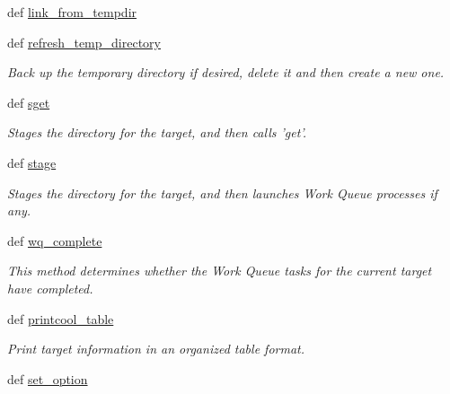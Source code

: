 \begin{DoxyCompactItemize}
def \hyperlink{classforcebalance_1_1target_1_1Target_a5aa4958cea0a48138511567a076c5a82}{link\-\_\-from\-\_\-tempdir}
\item 
def \hyperlink{classforcebalance_1_1target_1_1Target_afe815eafab06ac92f10bbf4b88ad95c8}{refresh\-\_\-temp\-\_\-directory}
\begin{DoxyCompactList}\small\item\em Back up the temporary directory if desired, delete it and then create a new one. \end{DoxyCompactList}\item 
def \hyperlink{classforcebalance_1_1target_1_1Target_a51d58b55242bf4d4909c1837174f5f3c}{sget}
\begin{DoxyCompactList}\small\item\em Stages the directory for the target, and then calls 'get'. \end{DoxyCompactList}\item 
def \hyperlink{classforcebalance_1_1target_1_1Target_af8d2a4658c87841e40296795aec478bb}{stage}
\begin{DoxyCompactList}\small\item\em Stages the directory for the target, and then launches Work Queue processes if any. \end{DoxyCompactList}\item 
def \hyperlink{classforcebalance_1_1target_1_1Target_af6099ec09486213869dba2491bd8ea04}{wq\-\_\-complete}
\begin{DoxyCompactList}\small\item\em This method determines whether the Work Queue tasks for the current target have completed. \end{DoxyCompactList}\item 
def \hyperlink{classforcebalance_1_1target_1_1Target_ac30a4e9d7d9fe06f7caefa5f7cfab09b}{printcool\-\_\-table}
\begin{DoxyCompactList}\small\item\em Print target information in an organized table format. \end{DoxyCompactList}\item 
def \hyperlink{classforcebalance_1_1BaseClass_a73e9a37a7632e79eb99f49bd15aced45}{set\-\_\-option}
\end{DoxyCompactItemize}
